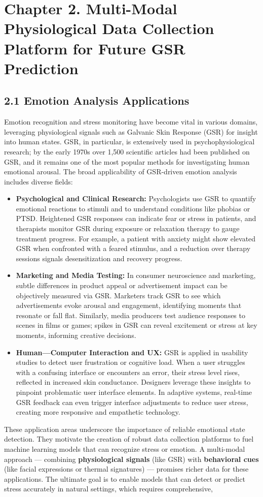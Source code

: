 \label{chap:2} \chapter{Chapter 2. Multi-Modal Physiological Data Collection Platform for Future GSR Prediction} \section{2.1 Emotion Analysis Applications} Emotion recognition and stress monitoring have become vital in various domains, leveraging physiological signals such as Galvanic Skin Response (GSR) for insight into human states. GSR, in particular, is extensively used in psychophysiological research; by the early 1970s over 1,500 scientific articles had been published on GSR, and it remains one of the most popular methods for investigating human emotional arousal. The broad applicability of GSR-driven emotion analysis includes diverse fields: \begin{itemize} \item \textbf{Psychological and Clinical Research:} Psychologists use GSR to quantify emotional reactions to stimuli and to understand conditions like phobias or PTSD. Heightened GSR responses can indicate fear or stress in patients, and therapists monitor GSR during exposure or relaxation therapy to gauge treatment progress. For example, a patient with anxiety might show elevated GSR when confronted with a feared stimulus, and a reduction over therapy sessions signals desensitization and recovery progress. \item \textbf{Marketing and Media Testing:} In consumer neuroscience and marketing, subtle differences in product appeal or advertisement impact can be objectively measured via GSR. Marketers track GSR to see which advertisements evoke arousal and engagement, identifying moments that resonate or fall flat. Similarly, media producers test audience responses to scenes in films or games; spikes in GSR can reveal excitement or stress at key moments, informing creative decisions. \item \textbf{Human---Computer Interaction and UX:} GSR is applied in usability studies to detect user frustration or cognitive load. When a user struggles with a confusing interface or encounters an error, their stress level rises, reflected in increased skin conductance. Designers leverage these insights to pinpoint problematic user interface elements. In adaptive systems, real-time GSR feedback can even trigger interface adjustments to reduce user stress, creating more responsive and empathetic technology. \end{itemize} These application areas underscore the importance of reliable emotional state detection. They motivate the creation of robust data collection platforms to fuel machine learning models that can recognize stress or emotion. A multi-modal approach --- combining \textbf{physiological signals} (like GSR) with \textbf{behavioral cues} (like facial expressions or thermal signatures) --- promises richer data for these applications. The ultimate goal is to enable models that can detect or predict stress accurately in natural settings, which requires comprehensive, 